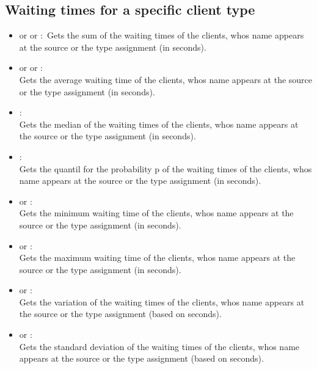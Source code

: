 \subsection{Waiting times for a specific client type}

\begin{itemize}

\item
{} or  or :\
Gets the sum of the waiting times of the clients, whos name appears at the source or the type assignment  (in seconds).

\item
{} or  or :\\
Gets the average waiting time of the clients, whos name appears at the source or the type assignment  (in seconds).

\item
{}:\\
Gets the median of the waiting times of the clients, whos name appears at the source or the type assignment  (in seconds).

\item
{}:\\
Gets the quantil for the probability p of the waiting times of the clients, whos name appears at the source or the type assignment  (in seconds).

\item
{} or :\\
Gets the minimum waiting time of the clients, whos name appears at the source or the type assignment  (in seconds).

\item
{} or :\\
Gets the maximum waiting time of the clients, whos name appears at the source or the type assignment  (in seconds).

\item
{} or :\\
Gets the variation of the waiting times of the clients, whos name appears at the source or the type assignment  (based on seconds).

\item
{} or :\\
Gets the standard deviation of the waiting times of the clients, whos name appears at the source or the type assignment  (based on seconds).


\end{itemize}
